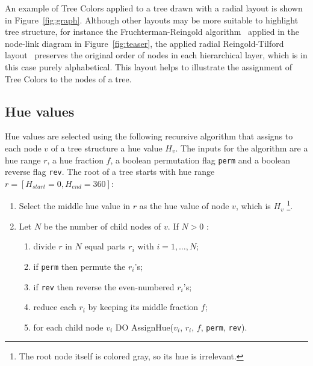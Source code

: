 \documentclass[journal]{vgtc}                %
\begin{document}
An example of Tree Colors applied to a tree drawn with a radial layout is shown in Figure~\ref{fig:graph}. 
Although other layouts may be more suitable to highlight tree structure, for instance the Fruchterman-Reingold algorithm~\cite{Fruchterman91} applied in the node-link diagram in Figure~\ref{fig:teaser}, the applied radial Reingold-Tilford layout~\cite{reingold81} preserves the original order of nodes in each hierarchical layer, which is in this case purely alphabetical. This layout helps to illustrate the assignment of Tree Colors to the nodes of a tree. 


\subsection{Hue values}
Hue values are selected using the following recursive algorithm that assigns to each node 
$v$ of a tree structure a hue value $H_{v}$. 
The inputs for the algorithm are a hue range $r$, a hue fraction $f$, a boolean permutation flag  
\texttt{perm} and a boolean reverse flag \texttt{rev}.
The root of a tree starts with hue range $r=[H_{start}=0, H_{end}=360]$:

%
\begin{enumerate} \itemsep1pt \parskip0pt 
\item Select the middle hue value in $r$ as the hue value of node $v$, which is $H_v$ \footnote{The root node itself is colored gray, so its hue is irrelevant.}.
\item Let $N$ be the number of child nodes of $v$. If $N>0$ :
\begin{enumerate}[i] \itemsep1pt \parskip0pt 
\item divide $r$ in $N$ equal parts $r_i$ with $i=1,\ldots,N$;
\item if \texttt{perm} then permute the $r_i$'s;
\item if \texttt{rev} then reverse the even-numbered $r_i$'s;
\item reduce each $r_i$ by keeping its middle fraction $f$;
\item for each child node $v_i$ DO AssignHue($v_i$, $r_i$, $f$, \texttt{perm}, \texttt{rev}).
\end{enumerate}
\end{enumerate}
\end{document}
